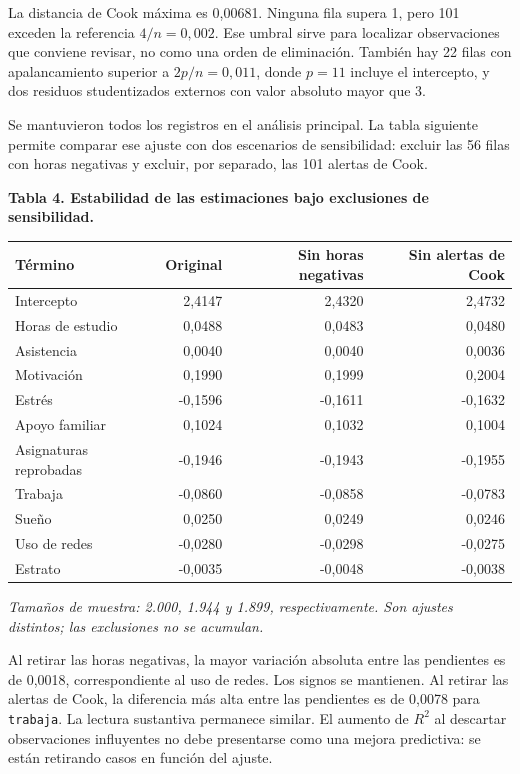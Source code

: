 \documentclass[
  11pt,
  letterpaper,
]{article}
\begin{document}
La distancia de Cook máxima es 0,00681. Ninguna fila supera 1, pero 101
exceden la referencia \(4/n=0{,}002\). Ese umbral sirve para localizar
observaciones que conviene revisar, no como una orden de eliminación.
También hay 22 filas con apalancamiento superior a \(2p/n=0{,}011\),
donde \(p=11\) incluye el intercepto, y dos residuos studentizados
externos con valor absoluto mayor que 3.

Se mantuvieron todos los registros en el análisis principal. La tabla
siguiente permite comparar ese ajuste con dos escenarios de
sensibilidad: excluir las 56 filas con horas negativas y excluir, por
separado, las 101 alertas de Cook.

\textbf{Tabla 4. Estabilidad de las estimaciones bajo exclusiones de
sensibilidad.}

\begin{longtable}[]{@{}lrrr@{}}
\toprule\noalign{}
Término & Original & Sin horas negativas & Sin alertas de Cook \\
\midrule\noalign{}
\endhead
\bottomrule\noalign{}
\endlastfoot
Intercepto & 2,4147 & 2,4320 & 2,4732 \\
Horas de estudio & 0,0488 & 0,0483 & 0,0480 \\
Asistencia & 0,0040 & 0,0040 & 0,0036 \\
Motivación & 0,1990 & 0,1999 & 0,2004 \\
Estrés & -0,1596 & -0,1611 & -0,1632 \\
Apoyo familiar & 0,1024 & 0,1032 & 0,1004 \\
Asignaturas reprobadas & -0,1946 & -0,1943 & -0,1955 \\
Trabaja & -0,0860 & -0,0858 & -0,0783 \\
Sueño & 0,0250 & 0,0249 & 0,0246 \\
Uso de redes & -0,0280 & -0,0298 & -0,0275 \\
Estrato & -0,0035 & -0,0048 & -0,0038 \\
\end{longtable}

\emph{Tamaños de muestra: 2.000, 1.944 y 1.899, respectivamente. Son
ajustes distintos; las exclusiones no se acumulan.}

Al retirar las horas negativas, la mayor variación absoluta entre las
pendientes es de 0,0018, correspondiente al uso de redes. Los signos se
mantienen. Al retirar las alertas de Cook, la diferencia más alta entre
las pendientes es de 0,0078 para \texttt{trabaja}. La lectura sustantiva
permanece similar. El aumento de \(R^2\) al descartar observaciones
influyentes no debe presentarse como una mejora predictiva: se están
retirando casos en función del ajuste.
\end{document}
